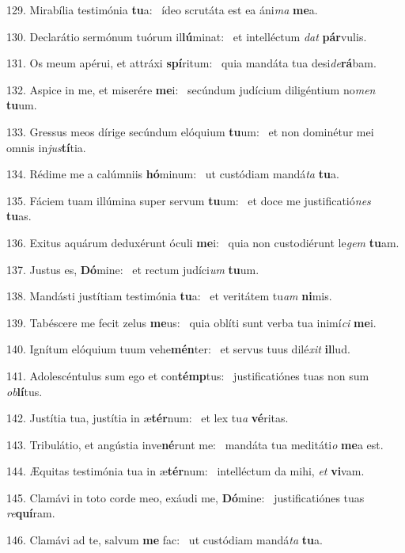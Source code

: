 129. Mirabília testimónia \textbf{tu}a: \ast\  ídeo scrutáta est ea áni\textit{ma} \textbf{me}a.\

130. Declarátio sermónum tuórum il\textbf{lú}minat: \ast\  et intelléctum \textit{dat} \textbf{pár}vulis.\

131. Os meum apérui, et attráxi \textbf{spí}ritum: \ast\  quia mandáta tua desi\textit{de}\textbf{rá}bam.\

132. Aspice in me, et miserére \textbf{me}i: \ast\  secúndum judícium diligéntium no\textit{men} \textbf{tu}um.\

133. Gressus meos dírige secúndum elóquium \textbf{tu}um: \ast\  et non dominétur mei omnis in\textit{jus}\textbf{tí}tia.\

134. Rédime me a calúmniis \textbf{hó}minum: \ast\  ut custódiam mandá\textit{ta} \textbf{tu}a.\

135. Fáciem tuam illúmina super servum \textbf{tu}um: \ast\  et doce me justificatió\textit{nes} \textbf{tu}as.\

136. Exitus aquárum deduxérunt óculi \textbf{me}i: \ast\  quia non custodiérunt le\textit{gem} \textbf{tu}am.\

137. Justus es, \textbf{Dó}mine: \ast\  et rectum judíci\textit{um} \textbf{tu}um.\

138. Mandásti justítiam testimónia \textbf{tu}a: \ast\  et veritátem tu\textit{am} \textbf{ni}mis.\

139. Tabéscere me fecit zelus \textbf{me}us: \ast\  quia oblíti sunt verba tua inimí\textit{ci} \textbf{me}i.\

140. Ignítum elóquium tuum vehe\textbf{mén}ter: \ast\  et servus tuus dilé\textit{xit} \textbf{il}lud.\

141. Adolescéntulus sum ego et con\textbf{témp}tus: \ast\  justificatiónes tuas non sum \textit{ob}\textbf{lí}tus.\

142. Justítia tua, justítia in æ\textbf{tér}num: \ast\  et lex tu\textit{a} \textbf{vé}ritas.\

143. Tribulátio, et angústia inve\textbf{né}runt me: \ast\  mandáta tua meditáti\textit{o} \textbf{me}a est.\

144. Æquitas testimónia tua in æ\textbf{tér}num: \ast\  intelléctum da mihi, \textit{et} \textbf{vi}vam.\

145. Clamávi in toto corde meo, exáudi me, \textbf{Dó}mine: \ast\  justificatiónes tuas \textit{re}\textbf{quí}ram.\

146. Clamávi ad te, salvum \textbf{me} fac: \ast\  ut custódiam mandá\textit{ta} \textbf{tu}a.\

